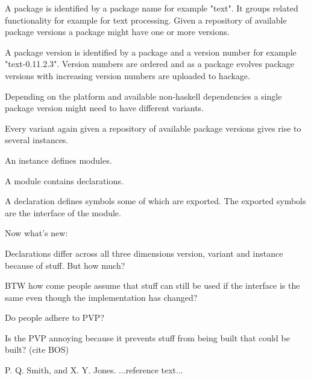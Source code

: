 \documentclass[preprint]{sigplanconf}
\begin{document}
A package is identified by a package name for example "text". It groups related functionality for example for text processing. Given a repository of available package versions a package might have one or more versions.

A package version is identified by a package and a version number for example "text-0.11.2.3". Version numbers are ordered and as a package evolves package versions with increasing version numbers are uploaded to hackage.

Depending on the platform and available non-haskell dependencies a single package version might need to have different variants.

Every variant again given a repository of available package versions gives rise to several instances.

An instance defines modules.

A module contains declarations.

A declaration defines symbols some of which are exported. The exported symbols are the interface of the module.

Now what's new:

Declarations differ across all three dimensions version, variant and instance because of stuff. But how much?

BTW how come people assume that stuff can still be used if the interface is the same even though the implementation has changed?

Do people adhere to PVP?

Is the PVP annoying because it prevents stuff from being built that could be built? (cite BOS)











\begin{thebibliography}{}
\softraggedright

P. Q. Smith, and X. Y. Jones. ...reference text...

\end{thebibliography}
\end{document}
